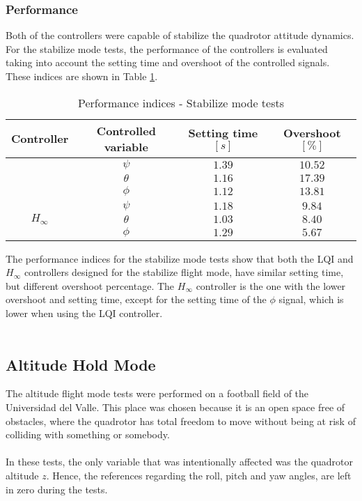 \subsubsection{Performance}
Both of the controllers were capable of stabilize the quadrotor attitude dynamics. For the stabilize mode tests, the performance of the controllers is evaluated taking into account the setting time and overshoot of the controlled signals. These indices are shown in Table \ref{tb:stabilize_index}.
\begin{table}[H]
\small
\begin{center}
\caption{Performance indices - Stabilize mode tests}\label{tb:stabilize_index}
\begin{tabular}{c|c|c|c}\hline
\rule{0pt}{3ex} Controller & Controlled variable & Setting time $[s]$ & Overshoot $[\%]$ \\\hline\hline
\rule{0pt}{3ex} 
\multirow{3}{*}{LQI} 
 & $\psi$ & $1.39$ & $10.52$ \\
 & $\theta$ & $1.16$ & $17.39$ \\
 & $\phi$ & $1.12$ & $13.81$\\ \hline
\multirow{3}{*}{$H_\infty$} 
 & $\psi$ & $1.18$ & $9.84$ \\
 & $\theta$ & $1.03$ & $8.40$ \\
 & $\phi$ & $1.29$ & $5.67$ \\ \hline\hline
\end{tabular}
\end{center}
\end{table}
The performance indices for the stabilize mode tests show that both the LQI and $H_\infty$ controllers designed for the stabilize flight mode, have similar setting time, but different overshoot percentage. The $H_\infty$ controller is the one with the lower overshoot and setting time, except for the setting time of the $\phi$ signal, which is lower when using the LQI controller.
\\\\
\subsection{Altitude Hold Mode}
The altitude flight mode tests were performed on a football field of the Universidad del Valle. This place was chosen because it is an open space free of obstacles, where the quadrotor has total freedom to move without being at risk of colliding with something or somebody.
\\\\
In these tests, the only variable that was intentionally affected was the quadrotor altitude $z$. Hence, the references regarding the roll, pitch and yaw angles, are left in zero during the tests.

